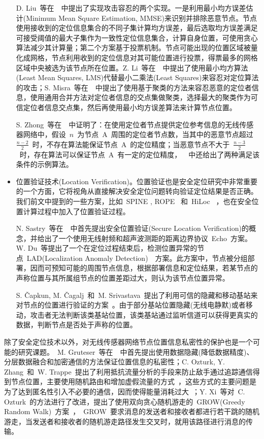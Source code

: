 \documentclass[a4paper,10pt]{article}
\begin{document}
\begin{itemize}
D. Liu~等在~\cite{Liu2005b, Liu2008a}~中提出了实现攻击容忍的两个实现。一是利用最小均方误差估计(Minimum Mean Square Estimation, MMSE)来识别并排除恶意节点。节点使用接收到的定位信息集合的不同子集计算均方误差，最后选取均方误差满足可接受阈值的最大子集作为一致性定位信息集合，计算自身位置，可使用贪心算法减少其计算量；第二个方案基于投票机制。节点可能出现的位置区域被量化成网格，节点利用收到的定位信息对其可能位置进行投票，得票最多的网格区域中央被选为该节点所在位置。Z. Li~等在~\cite{Li2005a}~中提出了使用最小均方算法(Least Mean Squares, LMS)代替最小二乘法(Least Squares)来容忍对定位算法的攻击；S. Misra~等在~\cite{Misra2007}~中提出了使用基于聚类的方法来容忍恶意的定位者信息，使用通用合并方法对定位者信息的交点集做聚类，选择最大的聚类作为可信定位者信息交点集，然后再使用最小均方误差算法来计算节点位置。

S. Zhong~等在~\cite{Zhong2008}~中证明了：在使用定位者节点提供定位参考信息的无线传感器网络中，假设~$n$~为节点~A~周围的定位者节点数，当其中的恶意节点超过~$\frac{n-2}{2}$~时，不存在算法能保证节点~A~的定位精度；当恶意节点不大于~$\frac{n-3}{2}$~时，存在算法可以保证节点~A~有一定的定位精度，~\cite{Zhong2008}~中还给出了两种满足该条件的示例算法。

\item 位置验证技术(Location Verification)。位置验证也是安全定位研究中非常重要的一个方面，它将视角从直接解决安全定位问题转向验证定位结果是否正确。我们前文中提到的一些方案，比如~SPINE \cite{Lazos2005a}, ROPE \cite{Lazos2006}~和~HiLoc \cite{Lazos2005a}~，也在安全位置计算过程中加入了位置验证过程。

N. Sastry~等在~\cite{Sastry2003}~中首先提出安全位置验证(Secure Location Verification)的概念，并给出了一个使用无线射频和超声波测距的距离边界协议~Echo~方案。W. Du~等提出了一个在定位过程结束后，检测位置异常的节点~LAD(Localization Anomaly Detection)~\cite{Du2006}~方案。此方案中，节点被分组部署，因而可预知可能的周围节点信息，根据部署信息和定位结果，若某节点的声称位置与其所属组节点的位置差距过大，则认为该节点位置异常。

S. \v{C}apkun, M. \v{C}agalj~和~M. Srivastava~提出了利用可信的隐藏和移动基站来对节点的位置进行验证的方案~\cite{Capkun2006a, Capkun2008}。由于部分基站位置隐藏(无线电静默)或者移动，攻击者无法判断该类基站位置，该类基站通过监听信道可以获得更真实的数据，判断节点是否处于声称的位置。

\end{itemize}

除了安全定位技术以外，对无线传感器网络节点位置信息私密性的保护也是一个可能的研究课题。~M. Gruteser~等在~\cite{Gruteser2003}~中首先提出使用数据隐藏(降低数据精度)、分层数据融合和加密通信的方法保证位置信息的私密性；C. Ozturk, Y. Zhang~和~W. Trappe~提出了利用抵抗流量分析的手段来防止敌手通过追踪通信得到节点位置，主要使用随机路由和增加虚假流量的方式~\cite{Ozturk2004}，这些方式的主要问题是为了达到匿名性引入不必要的通信，因而使得能量消耗过大~\cite{Xiao2006}；Y. Xi~等对~C. Ozturk~的方法进行了改进，提出了使用双向贪心随机游走的~GROW(Greedy Random Walk)~方案~\cite{Xi2006}，~GROW~要求消息的发送者和接收者都进行若干跳的随机游走，当发送者和接收者的随机游走路径发生交叉时，就用该路径进行消息的传输。
\end{document}
